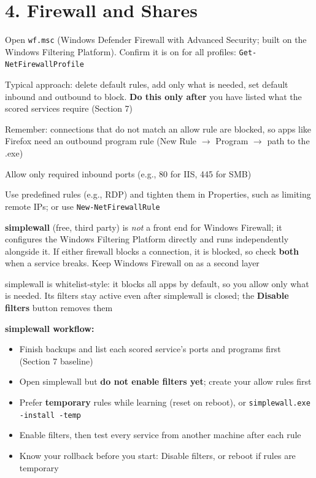 \documentclass[11pt]{article}
\newcommand{\cmd}[1]{\texttt{\small #1}}
\begin{document}
\section*{4. Firewall and Shares}
\begin{mycheck}
  \item Open \cmd{wf.msc} (Windows Defender Firewall with Advanced Security; built on the Windows Filtering Platform). Confirm it is on for all profiles: \cmd{Get-NetFirewallProfile}
  \item Typical approach: delete default rules, add only what is needed, set default inbound and outbound to block. \textbf{Do this only after} you have listed what the scored services require (Section 7)
  \item Remember: connections that do not match an allow rule are blocked, so apps like Firefox need an outbound program rule (New Rule $\rightarrow$ Program $\rightarrow$ path to the .exe)
  \item Allow only required inbound ports (e.g., 80 for IIS, 445 for SMB)
  \item Use predefined rules (e.g., RDP) and tighten them in Properties, such as limiting remote IPs; or use \cmd{New-NetFirewallRule}
  \item \textbf{simplewall} (free, third party) is \emph{not} a front end for Windows Firewall; it configures the Windows Filtering Platform directly and runs independently alongside it. If either firewall blocks a connection, it is blocked, so check \textbf{both} when a service breaks. Keep Windows Firewall on as a second layer
  \item simplewall is whitelist-style: it blocks all apps by default, so you allow only what is needed. Its filters stay active even after simplewall is closed; the \textbf{Disable filters} button removes them
  \item \textbf{simplewall workflow:}
  \begin{itemize}[itemsep=1pt, topsep=1pt]
    \item Finish backups and list each scored service's ports and programs first (Section 7 baseline)
    \item Open simplewall but \textbf{do not enable filters yet}; create your allow rules first
    \item Prefer \textbf{temporary} rules while learning (reset on reboot), or \cmd{simplewall.exe -install -temp}
    \item Enable filters, then test every service from another machine after each rule
    \item Know your rollback before you start: Disable filters, or reboot if rules are temporary

\end{itemize}
\end{mycheck}
\end{document}
